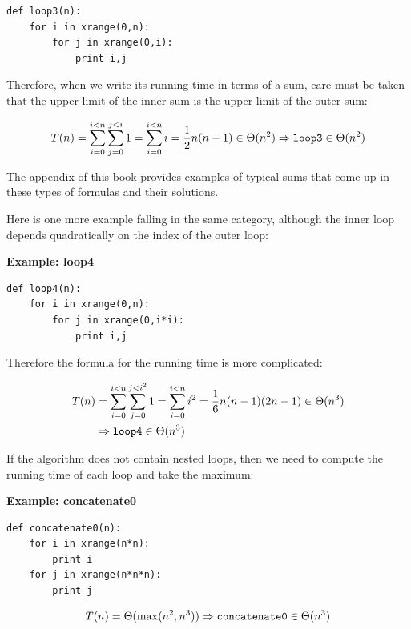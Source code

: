 \documentclass[justified,sixbynine]{tufte-book}
\def\subsubsection#1{{\bf #1}}
\theoremstyle{plain}%
\theoremstyle{definition}
\theoremstyle{remark}
\begin{document}
\begin{fullwidth}
\begin{lstlisting}
def loop3(n):
    for i in xrange(0,n):
        for j in xrange(0,i):
            print i,j
\end{lstlisting}

Therefore, when we write its running time in terms of a sum, care must be taken that the upper limit of the inner sum is the upper limit of the outer sum:

\begin{equation}
T(n)=\sum_{i=0}^{i<n}\sum_{j=0}^{j<i}1=\sum_{i=0}^{i<n}i=\frac 12n(n-1)\in
\Theta (n^2)\Rightarrow \text{{\tt loop3}}\in \Theta (n^2)
\end{equation}

The appendix of this book provides examples of typical sums that come up in these types of formulas and their solutions.

Here is one more example falling in the same category, although the inner loop depends quadratically on the index of the outer loop:

\subsubsection{Example: loop4}
\begin{lstlisting}
def loop4(n):
    for i in xrange(0,n):
        for j in xrange(0,i*i):
            print i,j
\end{lstlisting}

Therefore the formula for the running time is more complicated:

\begin{align}
T(n) &= \sum_{i=0}^{i<n}\sum_{j=0}^{j<i^2}1=\sum_{i=0}^{i<n}i^2=\frac
16n(n-1)(2n-1)\in \Theta (n^3) \\
&\Rightarrow \text{{\tt loop4}}\in \Theta (n^3)
\end{align}

If the algorithm does not contain nested loops, then we need to compute the running time of each loop and take the maximum:

\subsubsection{Example: concatenate0}
\begin{lstlisting}
def concatenate0(n):
    for i in xrange(n*n):
        print i
    for j in xrange(n*n*n):
        print j
\end{lstlisting}

\begin{equation}
T(n)=\Theta (\max (n^2,n^3))\Rightarrow \text{{\tt concatenate0}}\in \Theta
(n^3)
\end{equation}


\end{fullwidth}
\end{document}
